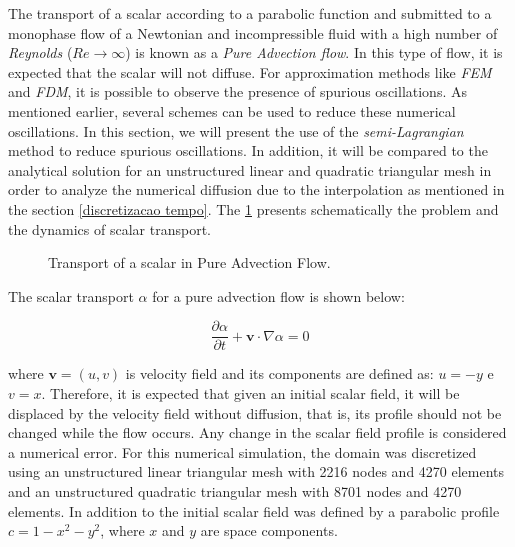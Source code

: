 The transport of a scalar according to a parabolic function and 
submitted to a monophase flow of a Newtonian and incompressible fluid 
with a high number of \textit{Reynolds} 
($\textit{Re} \rightarrow \infty$) is known as a 
\textit{Pure Advection flow}. In this type of flow, 
it is expected that the scalar will not diffuse. 
For approximation methods like \textit{FEM} and \textit{FDM}, 
it is possible to observe the presence of spurious oscillations. 
As mentioned earlier, several schemes can be used to reduce these 
numerical oscillations. In this section, we will present the use 
of the \textit{semi-Lagrangian} method to reduce spurious oscillations.
In addition, it will be compared to the analytical solution for an
unstructured linear and quadratic triangular mesh 
in order to analyze the numerical diffusion due to the interpolation
as mentioned in the section \ref{discretizacao tempo}. 
The \ref{conveccao} presents schematically the problem and 
the dynamics of scalar transport.

\vspace{0.5cm}
\begin{figure}[H]
\begin{center}
\end{center}
\caption{Transport of a scalar in Pure Advection Flow.}
\label{conveccao}
\end{figure}

\medskip
\noindent
The scalar transport $\alpha$ for a pure advection flow is shown below:


\begin{equation}
 \frac{\partial \alpha}{\partial t} 
 + 
 \textbf{v} \cdot \nabla \alpha
 = 0
\end{equation}

\noindent
where $\textbf{v} = (u,v)$ is velocity field and its components are
defined as: $u = -y$ e $v = x$. 
Therefore, it is expected that given an initial scalar field, 
it will be displaced by the velocity field without diffusion, 
that is, its profile should not be changed while the flow occurs. 
Any change in the scalar field profile is considered a numerical error.
For this numerical simulation, the domain was discretized using an
unstructured linear triangular mesh with 2216 nodes and 4270 elements
and an unstructured quadratic triangular mesh with 8701 nodes 
and 4270 elements.
In addition to the initial scalar field was defined by a parabolic
profile $c = 1 - x^2 - y^2$, where $x$ and $y$ are space components.



